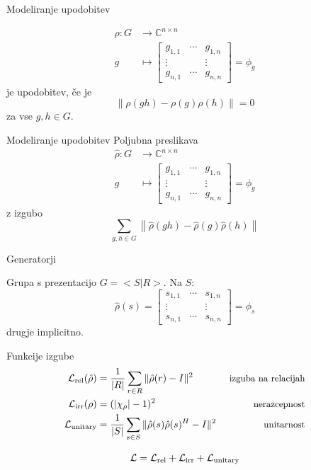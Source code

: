 \begin{frame}{\color{aoblue}Modeliranje upodobitev}

  \begin{align*}
    \rho \colon G &\to \mathbb{C}^{n \times n} \\
    g &\mapsto
    \begin{bmatrix}
      g_{1,1} & \cdots & g_{1,n} \\
      \vdots & & \vdots \\
      g_{n,1} & \cdots & g_{n,n}
    \end{bmatrix} = \phi_g
  \end{align*}
  je upodobitev, če je 
  $$
  \left\|
    \rho(gh) - \rho(g)\rho(h)
  \right\| = 0
  $$
  za vse $g, h \in G$.
\end{frame}
\begin{frame}{\color{aoblue}Modeliranje upodobitev}
Poljubna preslikava 
  \begin{align*}
   \hat {\rho} \colon G &\to \mathbb{C}^{n \times n} \\
    g &\mapsto
    \begin{bmatrix}
      g_{1,1} & \cdots & g_{1,n} \\
      \vdots & & \vdots \\
      g_{n,1} & \cdots & g_{n,n}
    \end{bmatrix} = \phi_g
  \end{align*}
  z izgubo 
  $$
  \sum_{g, h \in G} \left\|
    \hat{\rho}(gh) - \hat{\rho}(g)\hat{\rho}(h)
  \right\|
  $$
\end{frame}
\begin{frame}{Generatorji}

  Grupa s prezentacijo $G = <S | R>$. Na $S$:
  $$
  \hat{\rho}(s) =
  \begin{bmatrix}
    s_{1,1} & \cdots & s_{1,n} \\
    \vdots & & \vdots \\
    s_{n,1} & \cdots & s_{n,n}
  \end{bmatrix} = \phi_s
  $$ 
  drugje implicitno.
\end{frame}
\begin{frame}{Funkcije izgube}
        \begin{align*}
            \mathcal L _\text{rel}(\hat\rho) &= \frac{1}{|R|} \sum \limits_{r \in R}
    \|\hat \rho(r) - I  \|^2 
     &\text{ \small izguba na relacijah}\\ 
    \mathcal L _\text{irr}(\rho) &= (|\chi_\rho| - 1)^2 
     &\text{ \small nerazcepnost}\\
     \mathcal L _\text{unitary} &= \frac{1}{|S|} \sum \limits_{s \in S}
    \|\hat\rho(s) \hat\rho(s)^H - I\|^2
     &\text{ \small unitarnost}
    \end{align*}
    
$$
\mathcal L = \mathcal L _\text{rel} + \mathcal L _\text{irr} + \mathcal L _\text{unitary}
$$
\end{frame}
